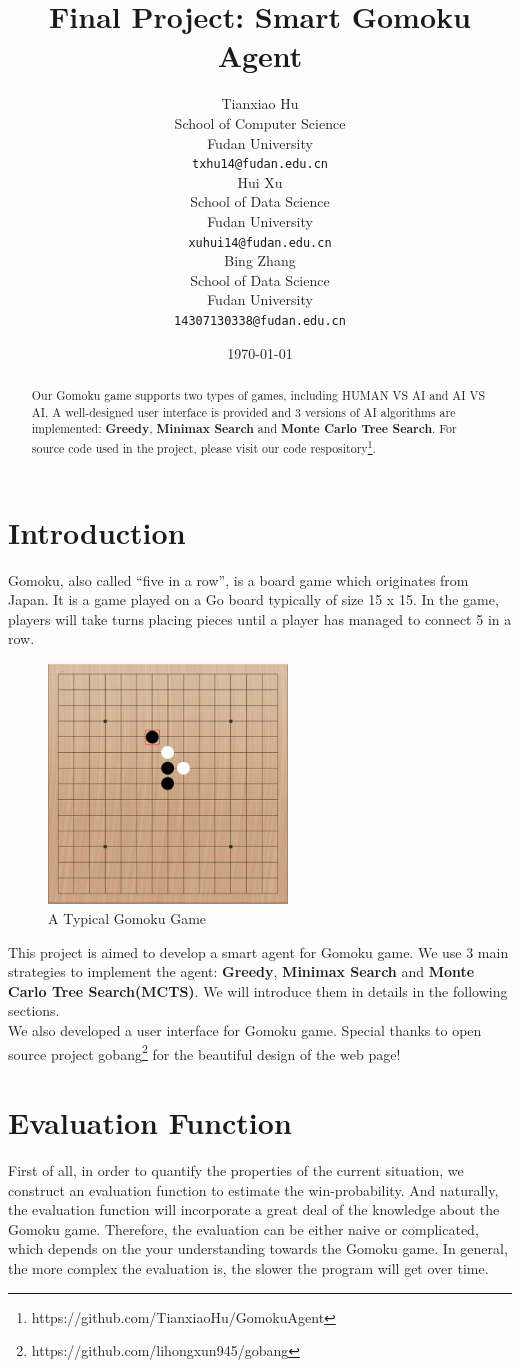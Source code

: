\documentclass[12pt,a4paper]{article}
\title{Final Project: Smart Gomoku Agent}
\author{Tianxiao Hu \\
  School of Computer Science\\
  Fudan University\\
  {\tt txhu14@fudan.edu.cn} \\\And
  Hui Xu \\
  School of Data Science\\
  Fudan University\\
  {\tt xuhui14@fudan.edu.cn} \\\And
  Bing Zhang \\
  School of Data Science\\
  Fudan University\\
  {\tt 14307130338@fudan.edu.cn}
}
\date{\today}
\begin{document}
\maketitle
\begin{abstract}
Our Gomoku game supports two types of games, including HUMAN VS AI and AI VS AI. A well-designed user interface is provided and 3 versions of AI algorithms are implemented: \textbf{Greedy}, \textbf{Minimax Search} and \textbf{Monte Carlo Tree Search}. For source code used in the project, please visit our code respository\footnote{https://github.com/TianxiaoHu/GomokuAgent}. 
\end{abstract}

\section{Introduction}
Gomoku, also called ``five in a row'', is a board game which originates from Japan. It is a game played on a Go board typically of size 15 x 15. In the game, players will take turns placing pieces until a player has managed to connect 5 in a row.

\begin{figure}[!h]
\centering\includegraphics[width=2.5in]{2.png}
\caption{A Typical Gomoku Game}
\end{figure}

This project is aimed to develop a smart agent for Gomoku game. We use 3 main strategies to implement the agent: \textbf{Greedy}, \textbf{Minimax Search} and \textbf{Monte Carlo Tree Search(MCTS)}. We will introduce them in details in the following sections.\\
We also developed a user interface for Gomoku game. Special thanks to open source project gobang\footnote{https://github.com/lihongxun945/gobang} for the beautiful design of the web page!
 
\section{Evaluation Function}
First of all, in order to quantify the properties of the current situation, we construct an evaluation function to estimate the win-probability. And naturally, the evaluation function will incorporate a great deal of the knowledge about the Gomoku game. Therefore, the evaluation can be either naive or complicated, which depends on the your understanding towards the Gomoku game. In general, the more complex the evaluation is, the slower the program will get over time.
\end{document}
